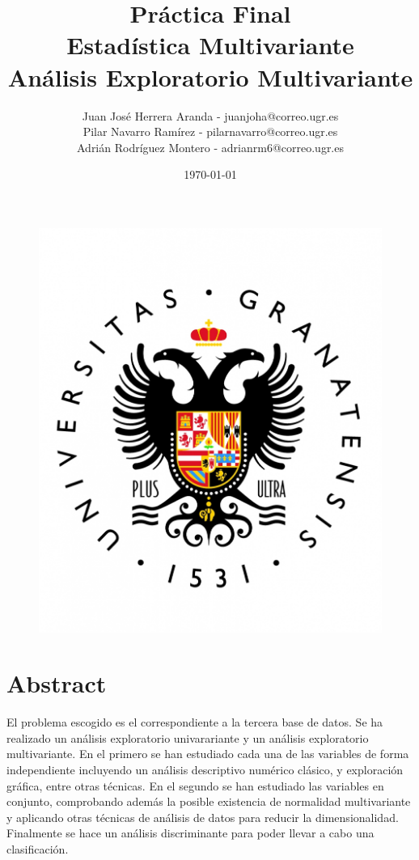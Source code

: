 \documentclass[11pt,a4paper]{article}
\title{Práctica Final
	\\\medskip \large \textbf{Estadística Multivariante} \\\medskip
	\large Análisis Exploratorio Multivariante}
\author{Juan José Herrera Aranda - juanjoha@correo.ugr.es \\
        Pilar Navarro Ramírez - pilarnavarro@correo.ugr.es \\
        Adrián Rodríguez Montero - adrianrm6@correo.ugr.es
    }
\date{ \today }
\begin{document}
	\maketitle 
	\begin{figure}[h]
    \includegraphics[scale=0.4]{UGR.jpg}
    \centering
    \end{figure}
	\newpage
	\tableofcontents
	\newpage
	
	\section{Abstract}
	
    	El problema escogido es el correspondiente a la tercera base de datos. Se ha realizado un análisis exploratorio univarariante y un análisis exploratorio multivariante. En el primero se han estudiado cada una de las variables de forma independiente incluyendo un análisis descriptivo numérico clásico, y exploración gráfica, entre otras técnicas. En el segundo se han estudiado las variables en conjunto, comprobando además la posible existencia de normalidad multivariante y aplicando otras técnicas de análisis de datos para reducir la dimensionalidad. Finalmente se hace un análisis discriminante para poder llevar a cabo una clasificación. \\
\end{document}

